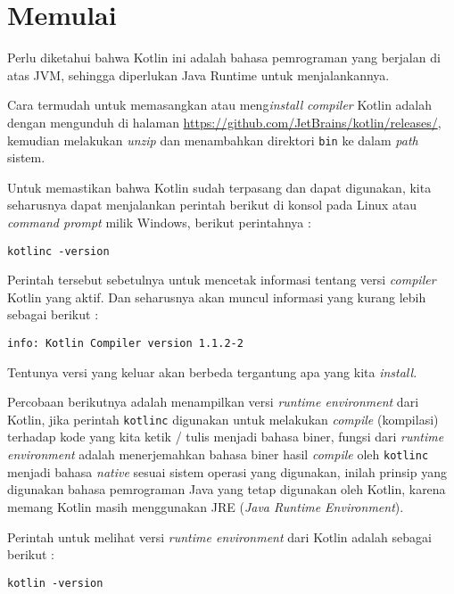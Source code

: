 \chapter{Memulai} 

Perlu diketahui bahwa Kotlin ini adalah bahasa pemrograman yang berjalan di atas JVM, sehingga diperlukan Java Runtime untuk menjalankannya.

Cara termudah untuk memasangkan atau meng\textit{install} \textit{compiler} Kotlin adalah dengan mengunduh di halaman \url{https://github.com/JetBrains/kotlin/releases/}, kemudian melakukan \textit{unzip} dan menambahkan direktori \texttt{bin} ke dalam \textit{path} sistem.

Untuk memastikan bahwa Kotlin sudah terpasang dan dapat digunakan, kita seharusnya dapat menjalankan perintah berikut di konsol pada Linux atau \textit{command prompt} milik Windows, berikut perintahnya :

\begin{lstlisting}
kotlinc -version
\end{lstlisting}

Perintah tersebut sebetulnya untuk mencetak informasi tentang versi \textit{compiler} Kotlin yang aktif. Dan seharusnya akan muncul informasi yang kurang lebih sebagai berikut :

\begin{lstlisting}
info: Kotlin Compiler version 1.1.2-2
\end{lstlisting}

Tentunya versi yang keluar akan berbeda tergantung apa yang kita \textit{install}.

Percobaan berikutnya adalah menampilkan versi \textit{runtime environment} dari Kotlin, jika perintah \texttt{kotlinc} digunakan untuk melakukan \textit{compile} (kompilasi) terhadap kode yang kita ketik / tulis menjadi bahasa biner, fungsi dari \textit{runtime environment} adalah menerjemahkan bahasa biner hasil \textit{compile} oleh \texttt{kotlinc} menjadi bahasa \textit{native} sesuai sistem operasi yang digunakan, inilah prinsip yang digunakan bahasa pemrograman Java yang tetap digunakan oleh Kotlin, karena memang Kotlin masih menggunakan JRE (\textit{Java Runtime Environment}).

Perintah untuk melihat versi \textit{runtime environment} dari Kotlin adalah sebagai berikut :

\begin{lstlisting}
kotlin -version
\end{lstlisting}

